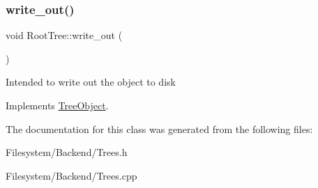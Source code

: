 \subsubsection{\texorpdfstring{write\+\_\+out()}{write\_out()}}
{\footnotesize\ttfamily void Root\+Tree\+::write\+\_\+out (\begin{DoxyParamCaption}{ }\end{DoxyParamCaption})\hspace{0.3cm}{\ttfamily [virtual]}}

Intended to write out the object to disk 

Implements \mbox{\hyperlink{classTreeObject_a63708d61353d83e3e03597394bb7aca0}{Tree\+Object}}.



The documentation for this class was generated from the following files\+:\begin{DoxyCompactItemize}
\item 
Filesystem/\+Backend/Trees.\+h\item 
Filesystem/\+Backend/Trees.\+cpp\end{DoxyCompactItemize}
